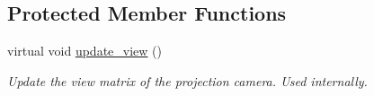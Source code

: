 \subsection*{Protected Member Functions}
\begin{DoxyCompactItemize}
\item 
\hypertarget{classgfx_1_1proj__cam_abc8a9c3bce414995385ccc7cdaeb3a1f}{virtual void \hyperlink{classgfx_1_1proj__cam_abc8a9c3bce414995385ccc7cdaeb3a1f}{update\-\_\-view} ()}\label{classgfx_1_1proj__cam_abc8a9c3bce414995385ccc7cdaeb3a1f}

\begin{DoxyCompactList}\small\item\em Update the view matrix of the projection camera. Used internally. \end{DoxyCompactList}\end{DoxyCompactItemize}

